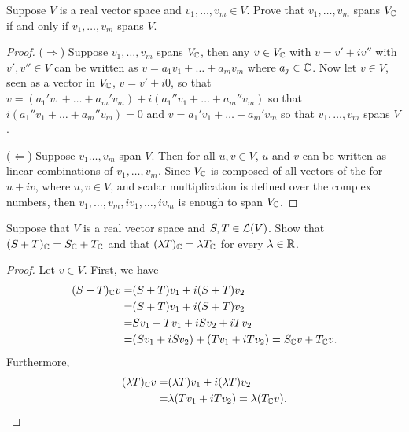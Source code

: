 \begin{exercise}{4}
  Suppose $V$ is a real vector space and $v_1,\dots,v_m\in V$. Prove that $v_1,\dots,v_m$ spans $V_{\mathbb{C}}$ if and only if $v_1,\dots,v_m$ spans $V$.
\end{exercise}
\begin{proof}
 ($\Rightarrow$) Suppose $v_1,\dots,v_m$ spans $V_{\mathbb{C}}$, then any $v\in V_{\mathbb{C}}$ with $v=v'+iv''$ with $v',v''\in V$ can be written as $v =a_1v_1+\dots+a_mv_m$ where $a_j\in\mathbb{C}$. Now let $v\in V$, seen as a vector in $V_{\mathbb{C}}$, $v=v'+i0$, so that $v=(a_1'v_1+\dots+a_m'v_m)+i(a_1''v_1+\dots+a_m''v_m)$ so that $i(a_1''v_1+\dots+a_m''v_m)=0$ and $v=a_1'v_1+\dots+a_m'v_m$ so that $v_1,\dots,v_m$ spans $V$.

 ($\Leftarrow$) Suppose $v_1\dots,v_m$ span $V$. Then for all $u,v\in V$, $u$ and $v$ can be written as linear combinations of $v_1,\dots,v_m$. Since $V_{\mathbb{C}}$ is composed of all vectors of the for $u+iv$, where $u,v\in V$, and scalar multiplication is defined over the complex numbers, then $v_1,\dots,v_m,iv_1,\dots,iv_m$ is enough to span $V_{\mathbb{C}}$.
\end{proof}

\begin{exercise}{5}
  Suppose that $V$ is a real vector space and $S,T\in\mathcal{L}(V)$. Show that $(S+T)_{\mathbb{C}} =S_{\mathbb{C}} +T_{\mathbb{C}}$ and that $(\lambda T)_{\mathbb{C}} =\lambda T_{\mathbb{C}}$ for every $\lambda\in\mathbb{R}$.
\end{exercise}
\begin{proof}
 Let $v\in V$. First, we have
 \begin{align*}
     (S+T)_{\mathbb{C}} v =& 
     (S+T)v_1 + i(S+T)v_2\\
     =& (S+T)v_1 + i(S+T)v_2\\
     =& Sv_1+Tv_1 + iSv_2+iTv_2\\
     =& (Sv_1+iSv_2) + (Tv_1+iTv_2) = S_{\mathbb{C}} v +T_{\mathbb{C}} v.
 \end{align*}
 Furthermore,
 \begin{align*}
     (\lambda T)_{\mathbb{C}} v =&
     (\lambda T)v_1 + i(\lambda T)v_2\\
     =& \lambda (Tv_1 + iTv_2) =\lambda(T_{\mathbb{C}} v).
 \end{align*}
\end{proof}

